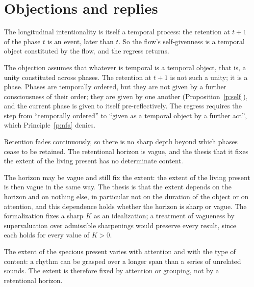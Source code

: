 \documentclass{situationist-preprint}
\begin{document}
\section{Objections and replies}\label{s:objections}

\begin{objection}[Regress]
The longitudinal intentionality is itself a temporal process: the retention at $t+1$ of the phase $t$ is an event, later than $t$. So the flow's self-givenness is a temporal object constituted by the flow, and the regress returns.
\end{objection}

\begin{reply}
The objection assumes that whatever is temporal is a temporal object, that is, a unity constituted across phases. The retention at $t+1$ is not such a unity; it is a phase. Phases are temporally ordered, but they are not given by a further consciousness of their order; they are given by one another (Proposition~\ref{p:self}), and the current phase is given to itself pre-reflectively. The regress requires the step from \enquote{temporally ordered} to \enquote{given as a temporal object by a further act}, which Principle~\ref{p:nfa} denies.
\end{reply}

\begin{objection}
Retention fades continuously, so there is no sharp depth beyond which phases cease to be retained. The retentional horizon is vague, and the thesis that it fixes the extent of the living present has no determinate content.
\end{objection}

\begin{reply}
The horizon may be vague and still fix the extent: the extent of the living present is then vague in the same way. The thesis is that the extent depends on the horizon and on nothing else, in particular not on the duration of the object or on attention, and this dependence holds whether the horizon is sharp or vague. The formalization fixes a sharp $K$ as an idealization; a treatment of vagueness by supervaluation over admissible sharpenings would preserve every result, since each holds for every value of $K>0$.
\end{reply}

\begin{objection}[Attention]
The extent of the specious present varies with attention and with the type of content: a rhythm can be grasped over a longer span than a series of unrelated sounds. The extent is therefore fixed by attention or grouping, not by a retentional horizon.
\end{objection}
\end{document}
